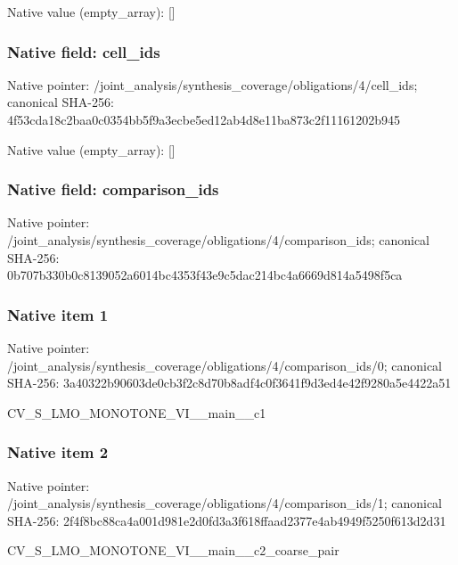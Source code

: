 \documentclass[10pt,a4paper]{article}
\begin{document}
Native value (empty\_\allowbreak{}array): []

\subsubsection{Native field: cell\_\allowbreak{}ids}
Native pointer: /joint\_\allowbreak{}analysis/synthesis\_\allowbreak{}coverage/obligations/4/cell\_\allowbreak{}ids; canonical SHA-256: 4f53cda18c2baa0c0354bb5f9a3ecbe5ed12ab4d8e11ba873c2f11161202b945

Native value (empty\_\allowbreak{}array): []

\subsubsection{Native field: comparison\_\allowbreak{}ids}
Native pointer: /joint\_\allowbreak{}analysis/synthesis\_\allowbreak{}coverage/obligations/4/comparison\_\allowbreak{}ids; canonical SHA-256: 0b707b330b0c8139052a6014bc4353f43e9c5dac214bc4a6669d814a5498f5ca

\subsubsection{Native item 1}
Native pointer: /joint\_\allowbreak{}analysis/synthesis\_\allowbreak{}coverage/obligations/4/comparison\_\allowbreak{}ids/0; canonical SHA-256: 3a40322b90603de0cb3f2c8d70b8adf4c0f3641f9d3ed4e42f9280a5e4422a51

\begingroup\raggedright\sloppy CV\_\allowbreak{}S\_\allowbreak{}LMO\_\allowbreak{}MONOTONE\_\allowbreak{}VI\_\allowbreak{}\_\allowbreak{}main\_\allowbreak{}\_\allowbreak{}c1\par\endgroup

\subsubsection{Native item 2}
Native pointer: /joint\_\allowbreak{}analysis/synthesis\_\allowbreak{}coverage/obligations/4/comparison\_\allowbreak{}ids/1; canonical SHA-256: 2f4f8bc88ca4a001d981e2d0fd3a3f618ffaad2377e4ab4949f5250f613d2d31

\begingroup\raggedright\sloppy CV\_\allowbreak{}S\_\allowbreak{}LMO\_\allowbreak{}MONOTONE\_\allowbreak{}VI\_\allowbreak{}\_\allowbreak{}main\_\allowbreak{}\_\allowbreak{}c2\_\allowbreak{}coarse\_\allowbreak{}pair\par\endgroup
\end{document}
